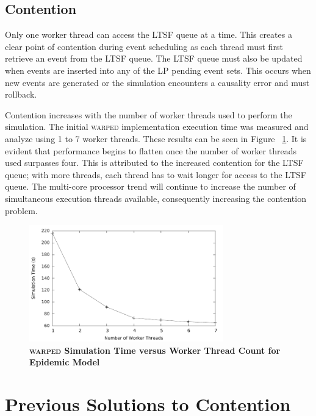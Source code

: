 \documentclass[11pt]{book}
\begin{document}
\subsection{Contention}

Only one worker thread can access the LTSF queue at a time.  This creates a clear point of
contention during event scheduling as each thread must first retrieve an event from the
LTSF queue.  The LTSF queue must also be updated when events are inserted into any of the
LP pending event sets.  This occurs when new events are generated or the simulation
encounters a causality error and must rollback.

Contention increases with the number of worker threads used to perform the
simulation.  The initial \textsc{warped} implementation execution time was
measured and analyze using 1 to 7 worker threads.  These results can be seen in
Figure ~\ref{fig:notsx_profile}.  It is evident that performance begins to
flatten once the number of worker threads used surpasses four.  This is
attributed to the increased contention for the LTSF queue; with more threads,
each thread has to wait longer for access to the LTSF queue.  The multi-core
processor trend will continue to increase the number of simultaneous execution
threads available, consequently increasing the contention problem.

\begin{figure}[H]
    \centering
    \graphicspath{ {./figures/} }
    \includegraphics[width=0.75\textwidth,keepaspectratio]{notsx_profile}
    \caption{\textbf{\textsc{warped} Simulation Time versus Worker Thread Count for
    Epidemic Model}}
    \label{fig:notsx_profile}
\end{figure}

\section{Previous Solutions to Contention}
\end{document}
